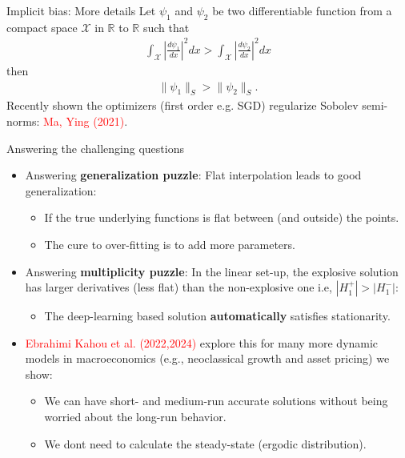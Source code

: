 \documentclass[aspectratio=169,10pt]{beamer}
\newcommand{\emphcolor}[1]{\textbf{\textcolor{emphcolorval}{#1}}}
\begin{document}
\begin{frame}{Implicit bias: More details}
	Let $\psi_1$ and $\psi_2$ be two differentiable function from a compact space $\mathcal{X}$ in $\mathbb{R}$ to $\mathbb{R}$ such that
	\begin{align*}
		\int_\mathcal{X}\left|\frac{d \psi_1}{dx}\right|^2 dx >   \int_\mathcal{X}\left|\frac{d \psi_2}{dx}\right|^2 dx
	\end{align*}
	then
	\begin{align*}
		\|\psi_1\|_S > \|\psi_2\|_S.
	\end{align*}
	Recently shown the optimizers (first order e.g. SGD) regularize Sobolev semi-norms: \textcolor{red}{Ma, Ying (2021)}.
\end{frame}


\begin{frame}{Answering the challenging questions}
	\begin{itemize}
		\item Answering \emphcolor{generalization puzzle}: Flat  interpolation leads to good generalization:\vspace{0.1in}
		\begin{itemize}
			\item If the true underlying functions is flat between (and outside) the points.\vspace{0.1in}
			\item The cure to over-fitting is to add more parameters.\vspace{0.1in}
		\end{itemize}
	 \item Answering \emphcolor{multiplicity puzzle}: In the linear set-up, the explosive solution has larger derivatives (less flat) than the non-explosive one i.e, $|H_1^+| > |H_1^-|$:\vspace{0.1in}
	 \begin{itemize}
	 	\item The deep-learning based solution \emphcolor{automatically} satisfies stationarity. \vspace{0.1in}
	 \end{itemize}
	\item \textcolor{red}{Ebrahimi Kahou et al. (2022,2024)} explore this for many more dynamic models in macroeconomics (e.g., neoclassical growth and asset pricing) we show: \vspace{0.1in}
	\begin{itemize}
		\item We can have short- and medium-run accurate solutions without being worried about the long-run behavior.\vspace{0.1in}
		\item  We dont need to calculate the steady-state (ergodic distribution).
	\end{itemize} 	
	\end{itemize}
	
\end{frame}				
\end{document}
